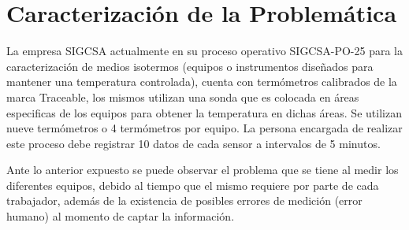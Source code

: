 \section{Caracterización de la Problemática}

\par 
La empresa SIGCSA actualmente en su proceso operativo SIGCSA-PO-25 para la caracterización de medios isotermos (equipos o instrumentos diseñados para mantener una temperatura controlada), cuenta con termómetros calibrados de la marca Traceable, los mismos utilizan una sonda que es colocada en áreas especificas de los equipos para obtener la temperatura en dichas áreas. Se utilizan nueve termómetros o 4 termómetros por equipo. La persona encargada de realizar este proceso debe registrar 10 datos de cada sensor a intervalos de 5 minutos.

\par \noindent
Ante lo anterior expuesto se puede observar el problema que se tiene al medir los diferentes equipos, debido al tiempo que el mismo requiere por parte de cada trabajador, además de la existencia de posibles errores de medición (error humano) al momento de captar la información.


